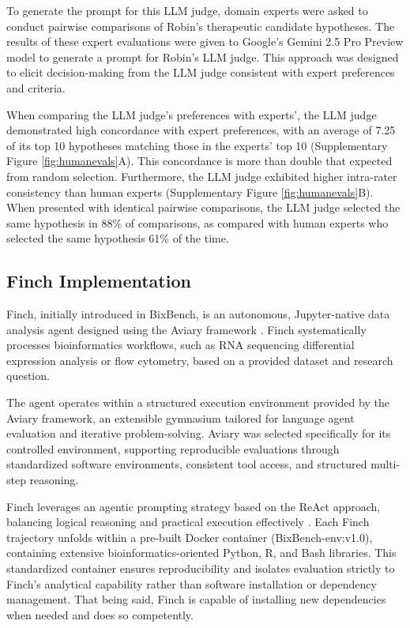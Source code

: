 \documentclass{article}
\begin{document}
To generate the prompt for this LLM judge, domain experts were asked to conduct pairwise comparisons of Robin’s therapeutic candidate hypotheses. The results of these expert evaluations were given to Google's Gemini 2.5 Pro Preview model to generate a prompt for Robin’s LLM judge. This approach was designed to elicit decision-making from the LLM judge consistent with expert preferences and criteria.

When comparing the LLM judge’s preferences with experts’, the LLM judge demonstrated high concordance with expert preferences, with an average of 7.25 of its top 10 hypotheses matching those in the experts' top 10 (Supplementary Figure \ref{fig:humanevals}A). This concordance is more than double that expected from random selection. Furthermore, the LLM judge exhibited higher intra-rater consistency than human experts (Supplementary Figure \ref{fig:humanevals}B). When presented with identical pairwise comparisons, the LLM judge selected the same hypothesis in 88\% of comparisons, as compared with human experts who selected the same hypothesis 61\% of the time.

\subsection{Finch Implementation}

Finch, initially introduced in BixBench, is an autonomous, Jupyter-native data analysis agent designed using the Aviary framework \cite{Narayanan_Braza_Griffiths_Ponnapati_Bou_Laurent_Kabeli_Wellawatte_Cox_Rodriques_et}. Finch systematically processes bioinformatics workflows, such as RNA sequencing differential expression analysis or flow cytometry, based on a provided dataset and research question.

The agent operates within a structured execution environment provided by the Aviary framework, an extensible gymnasium tailored for language agent evaluation and iterative problem-solving. Aviary was selected specifically for its controlled environment, supporting reproducible evaluations through standardized software environments, consistent tool access, and structured multi-step reasoning.

Finch leverages an agentic prompting strategy based on the ReAct approach, balancing logical reasoning and practical execution effectively \cite{Yao_Zhao_Yu_Du_Shafran_Narasimhan_Cao_2023}. Each Finch trajectory unfolds within a pre-built Docker container (BixBench-env:v1.0), containing extensive bioinformatics-oriented Python, R, and Bash libraries. This standardized container ensures reproducibility and isolates evaluation strictly to Finch’s analytical capability rather than software installation or dependency management. That being said, Finch is capable of installing new dependencies when needed and does so competently.
\end{document}
